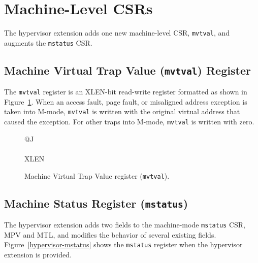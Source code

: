 \section{Machine-Level CSRs}

The hypervisor extension adds one new machine-level CSR, {\tt mvtval}, and
augments the {\tt mstatus} CSR.

\subsection{Machine Virtual Trap Value ({\tt mvtval}) Register}

The {\tt mvtval} register is an XLEN-bit read-write register formatted as shown
in Figure~\ref{mvtvalreg}.  When an access fault, page fault, or misaligned
address exception is taken into M-mode, {\tt mvtval} is
written with the original virtual address that caused the exception.
For other traps into M-mode, {\tt mvtval} is written with zero.

\begin{figure}[h!]
{\footnotesize
\begin{center}
\begin{tabular}{@{}J}
 \\
\hline
{} \\
\hline
XLEN \\
\end{tabular}
\end{center}
}
\vspace{-0.1in}
\caption{Machine Virtual Trap Value register ({\tt mvtval}).}
\label{mvtvalreg}
\end{figure}

\subsection{Machine Status Register ({\tt mstatus})}

The hypervisor extension adds two fields to the machine-mode {\tt mstatus} CSR,
MPV and MTL,
and modifies the behavior of several existing fields.
Figure~\ref{hypervisor-mstatus} shows the {\tt mstatus} register when the
hypervisor extension is provided.

